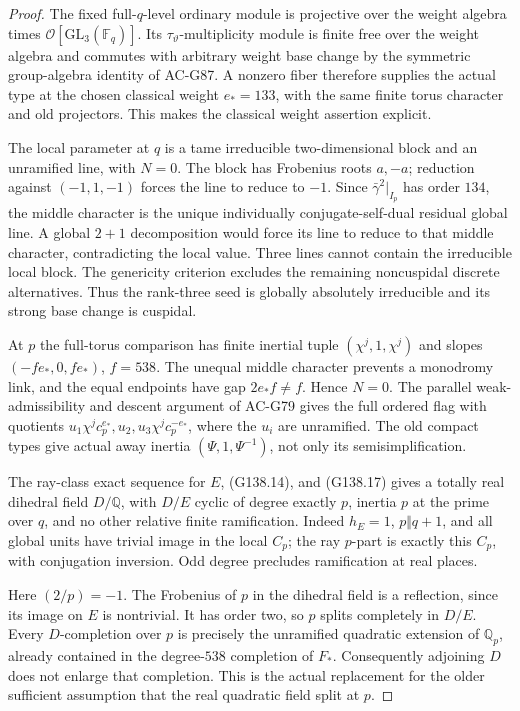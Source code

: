 \begin{proof}
The fixed full-\(q\)-level ordinary module is projective over
the weight algebra times \(\mathcal O[\mathrm{GL}_3(\mathbb F_q)]\).
Its \(\tau_\vartheta\)-multiplicity module is finite free over
the weight algebra and commutes with arbitrary weight base
change by the symmetric group-algebra identity of AC-G87.
A nonzero fiber therefore supplies the actual type at the
chosen classical weight \(e_*=133\), with the same finite
torus character and old projectors.  This makes the classical
weight assertion explicit.

The local parameter at \(q\) is a tame irreducible two-dimensional
block and an unramified line, with \(N=0\).
The block has Frobenius roots \(a,-a\); reduction against
\((-1,1,-1)\) forces the line to reduce to \(-1\).
Since \(\bar\gamma^2|_{I_p}\) has order \(134\), the middle
character is the unique individually conjugate-self-dual
residual global line.  A global \(2+1\) decomposition would
force its line to reduce to that middle character, contradicting
the local value.  Three lines cannot contain the irreducible
local block.  The genericity criterion excludes the remaining
noncuspidal discrete alternatives.  Thus the rank-three seed
is globally absolutely irreducible and its strong base change
is cuspidal.

At \(p\) the full-torus comparison has finite inertial tuple
\((\chi^j,1,\chi^j)\) and slopes \((-fe_*,0,fe_*)\),
\(f=538\).  The unequal middle character prevents a monodromy
link, and the equal endpoints have gap \(2e_*f\ne f\).
Hence \(N=0\).  The parallel weak-admissibility and descent
argument of AC-G79 gives the full ordered flag with quotients
\(u_1\chi^jc_p^{e_*},u_2,u_3\chi^jc_p^{-e_*}\), where
the \(u_i\) are unramified.  The old compact types give
actual away inertia \((\Psi,1,\Psi^{-1})\), not only its
semisimplification.

The ray-class exact sequence for \(E\), (G138.14), and
(G138.17) gives a totally real dihedral field \(D/\mathbb Q\),
with \(D/E\) cyclic of degree exactly \(p\), inertia \(p\)
at the prime over \(q\), and no other relative finite
ramification.  Indeed \(h_E=1\), \(p\Vert q+1\), and all
global units have trivial image in the local \(C_p\); the ray
\(p\)-part is exactly this \(C_p\), with conjugation inversion.
Odd degree precludes ramification at real places.

Here \((2/p)=-1\).  The Frobenius of \(p\) in the dihedral
field is a reflection, since its image on \(E\) is nontrivial.
It has order two, so \(p\) splits completely in \(D/E\).
Every \(D\)-completion over \(p\) is precisely the unramified
quadratic extension of \(\mathbb Q_p\), already contained in
the degree-\(538\) completion of \(F_*\).
Consequently adjoining \(D\) does not enlarge that completion.
This is the actual replacement for the older sufficient
assumption that the real quadratic field split at \(p\).


\end{proof}
